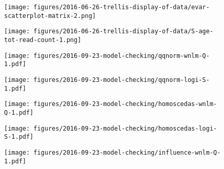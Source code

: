 \documentclass[letterpaper]{article}
\begin{document}
\begin{figure}
\begin{center}
\texttt{[image: figures/2016-06-26-trellis-display-of-data/evar-scatterplot-matrix-2.png]}
\end{center}
\caption{}
\label{fig:predictor-associations}
\end{figure}

\begin{figure}
\begin{center}
\texttt{[image: figures/2016-06-26-trellis-display-of-data/S-age-tot-read-count-1.png]}
\end{center}
\caption{}
\label{fig:weight-of-evidence}
\end{figure}

\begin{figure}
\begin{center}
\texttt{[image: figures/2016-09-23-model-checking/qqnorm-wnlm-Q-1.pdf]}
\end{center}
\caption{}
\label{fig:qqnorm-wnlm.Q}
\end{figure}

\begin{figure}
\begin{center}
\texttt{[image: figures/2016-09-23-model-checking/qqnorm-logi-S-1.pdf]}
\end{center}
\caption{}
\label{fig:qqnorm-logi.S}
\end{figure}

\begin{figure}
\begin{center}
\texttt{[image: figures/2016-09-23-model-checking/homoscedas-wnlm-Q-1.pdf]}
\end{center}
\caption{}
\label{fig:homoscedas-wnlm.Q}
\end{figure}

\begin{figure}
\begin{center}
\texttt{[image: figures/2016-09-23-model-checking/homoscedas-logi-S-1.pdf]}
\end{center}
\caption{}
\label{fig:homoscedas-logi.S}
\end{figure}

\begin{figure}
\begin{center}
\texttt{[image: figures/2016-09-23-model-checking/influence-wnlm-Q-1.pdf]}
\end{center}
\caption{}
\label{fig:influence-wnlm.Q}
\end{figure}
\end{document}
